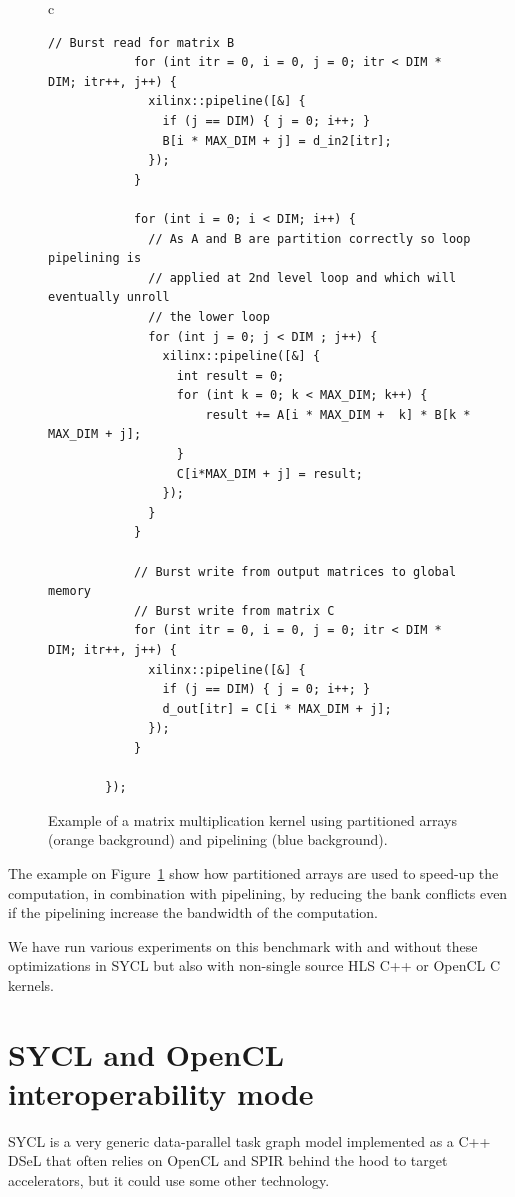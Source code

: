 \documentclass[sigplan, review, authordraft]{acmart}
\begin{document}
\begin{figure}
\begin{tabular}{c}
\begin{lstlisting}[basicstyle=\scriptsize,name=PartitionCyclicblockTriSYCL]
            // Burst read for matrix B
            for (int itr = 0, i = 0, j = 0; itr < DIM * DIM; itr++, j++) {
              xilinx::pipeline([&] {
                if (j == DIM) { j = 0; i++; }
                B[i * MAX_DIM + j] = d_in2[itr];
              });
            }

            for (int i = 0; i < DIM; i++) {
              // As A and B are partition correctly so loop pipelining is
              // applied at 2nd level loop and which will eventually unroll
              // the lower loop
              for (int j = 0; j < DIM ; j++) {
                xilinx::pipeline([&] {
                  int result = 0;
                  for (int k = 0; k < MAX_DIM; k++) {
                      result += A[i * MAX_DIM +  k] * B[k * MAX_DIM + j];
                  }
                  C[i*MAX_DIM + j] = result;
                });
              }
            }

            // Burst write from output matrices to global memory
            // Burst write from matrix C
            for (int itr = 0, i = 0, j = 0; itr < DIM * DIM; itr++, j++) {
              xilinx::pipeline([&] {
                if (j == DIM) { j = 0; i++; }
                d_out[itr] = C[i * MAX_DIM + j];
              });
            }

        });
    \end{lstlisting}
  \end{tabular}
  \caption{Example of a matrix multiplication kernel using partitioned
    arrays (orange background) and pipelining (blue background).}
  \label{fig:SYCL-partition-cyclic-block}
\end{figure}

The example on Figure~\ref{fig:SYCL-partition-cyclic-block} show how
partitioned arrays are used to speed-up the computation, in
combination with pipelining, by reducing the bank conflicts even if
the pipelining increase the bandwidth of the computation.

We have run various experiments on this benchmark with and without
these optimizations in SYCL but also with non-single source HLS C++ or
OpenCL C kernels.


\section{SYCL and OpenCL interoperability mode}
\label{sec:sycl-opencl-inter}

SYCL is a very generic data-parallel task graph model implemented as a
C++ DSeL that often relies on OpenCL and SPIR behind the hood to
target accelerators, but it could use some other technology.
\end{document}
